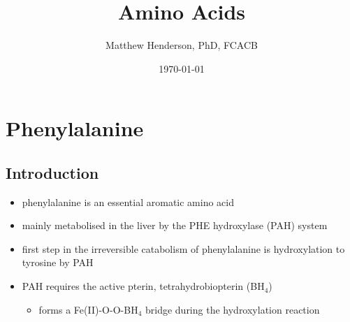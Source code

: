 \documentclass{scrartcl}
\author{Matthew Henderson, PhD, FCACB}
\date{\today}
\title{Amino Acids}
\begin{document}
\maketitle
\setcounter{tocdepth}{2}
\tableofcontents


\section{Phenylalanine}
\label{sec:org146c638}
\subsection{Introduction}
\label{sec:org893b1c8}
\begin{itemize}
\item phenylalanine is an essential aromatic amino acid
\item mainly metabolised in the liver by the PHE hydroxylase (PAH) system
\item first step in the irreversible catabolism of phenylalanine is hydroxylation to
tyrosine by PAH
\item PAH requires the active pterin, tetrahydrobiopterin (BH\(_{\text{4}}\))
\begin{itemize}
\item forms a Fe(II)-O-O-BH\(_{\text{4}}\) bridge during the hydroxylation reaction
\end{itemize}
\end{itemize}
\end{document}
